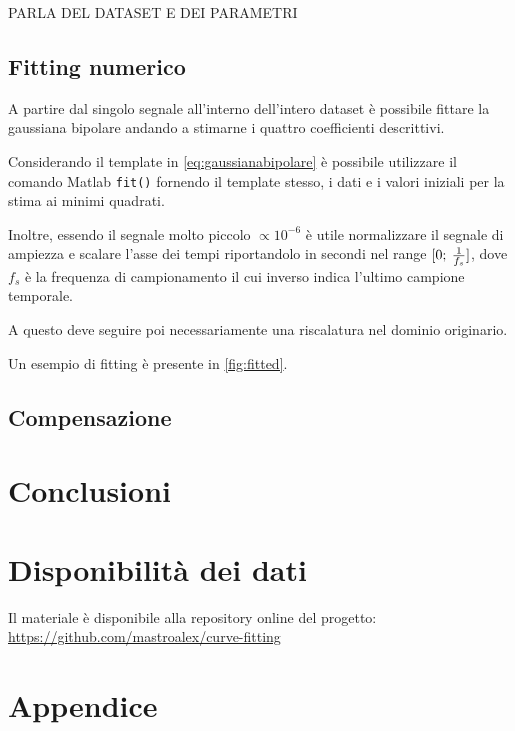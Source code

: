 PARLA DEL DATASET E DEI PARAMETRI 

\subsection{Fitting numerico}

A partire dal singolo segnale all'interno dell'intero dataset è possibile fittare la gaussiana bipolare andando a stimarne i quattro coefficienti descrittivi.

Considerando il template in \cref{eq:gaussianabipolare} è possibile utilizzare il comando Matlab \texttt{fit()} fornendo il template stesso, i dati e i valori iniziali per la stima ai minimi quadrati.

Inoltre, essendo il segnale molto piccolo $\propto 10^{-6}$ è utile normalizzare il segnale di ampiezza e scalare l'asse dei tempi riportandolo in secondi nel range $[0;\:{1\over f_s}]$, dove $f_s$ è la frequenza di campionamento il cui inverso indica l'ultimo campione temporale.

A questo deve seguire poi necessariamente una riscalatura nel dominio originario. 

Un esempio di fitting è presente in \cref{fig:fitted}.


\subsection{Compensazione}


\section{Conclusioni}


\section*{Disponibilità dei dati}

Il materiale è disponibile alla repository online del progetto: \url{https://github.com/mastroalex/curve-fitting}


\raggedbottom
\printbibliography[title=Riferimenti]


\clearpage
\onecolumn
\section*{Appendice}




